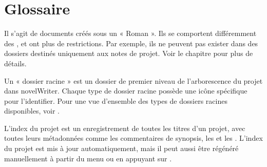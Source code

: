 \documentclass[a4paper,11pt,french]{sphinxmanual}
\begin{document}
\chapter{Glossaire}
\label{\detokenize{int_glossary:glossary}}\label{\detokenize{int_glossary:a-glossary}}\label{\detokenize{int_glossary::doc}}\begin{description}
\sphinxAtStartPar
Il s’agit de documents créés sous un {\hyperref[\detokenize{int_glossary:term-Root-Folder}]{}} « Roman ». Ils se comportent différemment des {\hyperref[\detokenize{int_glossary:term-Project-Notes}]{}}, et ont plus de restrictions. Par exemple, ils ne peuvent pas exister dans des dossiers destinés uniquement aux notes de projet. Voir le chapitre {\hyperref[\detokenize{project_structure:a-struct}]{}} pour plus de détails.

\sphinxAtStartPar
Un « dossier racine » est un dossier de premier niveau de l’arborescence du projet dans novelWriter. Chaque type de dossier racine possède une icône spécifique pour l’identifier. Pour une vue d’ensemble des types de dossiers racines disponibles, voir {\hyperref[\detokenize{project_overview:a-proj-roots}]{}}.

\sphinxAtStartPar
L’index du projet est un enregistrement de toutes les titres d’un projet, avec toutes leurs métadonnées comme les commentaires de synopsis, les {\hyperref[\detokenize{int_glossary:term-Tag}]{}} et les {\hyperref[\detokenize{int_glossary:term-Reference}]{}}. L’index du projet est mis à jour automatiquement, mais il peut aussi être régénéré manuellement à partir du menu  ou en appuyant sur .


\end{description}
\end{document}
